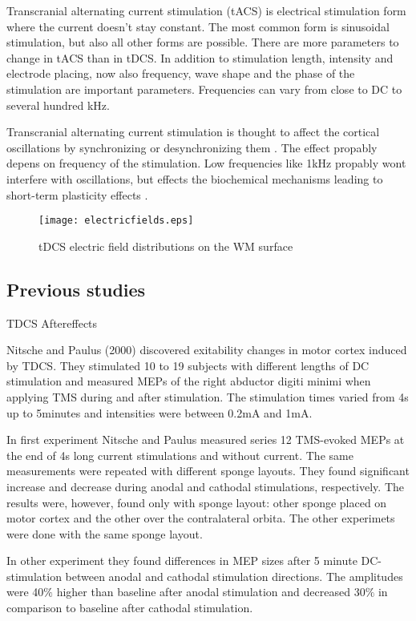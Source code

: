 \documentclass[english,12pt,a4paper,dvips]{article}
\begin{document}
Transcranial alternating current stimulation (tACS) is electrical stimulation form where the current doesn't stay constant. The most common form is sinusoidal stimulation, but also all other forms are possible. There are more parameters to change in tACS than in tDCS. In addition to stimulation length, intensity and electrode placing, now also frequency, wave shape and the phase of the stimulation are important parameters. Frequencies can vary from close to DC to several hundred kHz. 

Transcranial alternating current stimulation is thought to affect the cortical oscillations by synchronizing or desynchronizing them \cite{antal13}. The effect propably depens on frequency of the stimulation. Low frequencies like 1kHz propably wont interfere with oscillations, but effects the biochemical mechanisms leading to short-term plasticity effects \cite{antal13}. 

\begin{figure}[here]
\texttt{[image: electricfields.eps]}
\caption{tDCS electric field distributions on the WM surface}
\label{fig:tdcs}
\end{figure}



\subsection{Previous studies}

TDCS Aftereffects

Nitsche and Paulus (2000) discovered exitability changes in motor cortex induced by TDCS. 
They stimulated 10 to 19 subjects with different lengths of DC stimulation and measured MEPs of the 
right abductor digiti minimi when applying TMS during and after stimulation.
The stimulation times varied from 4s up to 5minutes and intensities were between 0.2mA and 1mA. \cite{nitsche00}


In first experiment Nitsche and Paulus measured series 12 TMS-evoked MEPs at the end of 4s long current 
stimulations and without current. 
The same measurements were repeated with different sponge layouts.
They found significant increase and decrease during anodal and cathodal stimulations, respectively. 
The results were, however, found only with sponge layout: other sponge placed on motor cortex and the 
other over the contralateral orbita. 
The other experimets were done with the same sponge layout. \cite{nitsche00}

In other experiment they found differences in MEP sizes after 5 minute DC-stimulation between anodal and 
cathodal stimulation directions. 
The amplitudes were 40$\%$ higher than baseline after anodal stimulation and decreased 30$\%$ in 
comparison to baseline after cathodal stimulation. \cite{nitsche00}
\end{document}

